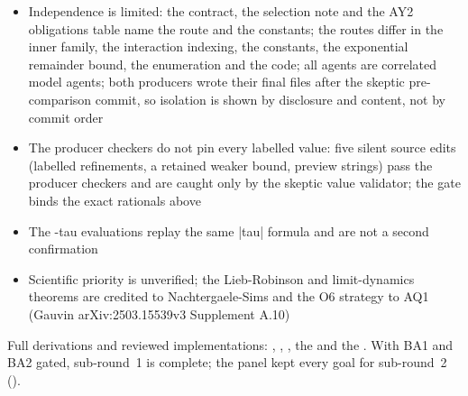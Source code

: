 \begin{gatequote}
\begin{itemize}
compactness and diagonal extraction via AY1; the I1 dictionary;
Stone\textquotesingle{}s theorem, Fourier inversion and the tensor-product
exponential of commuting self-adjoint operators on separate factors
\item Independence is limited: the contract, the selection note and the AY2
obligations table name the route and the constants; the routes differ in the
inner family, the interaction indexing, the constants, the exponential
remainder bound, the enumeration and the code; all agents are correlated model
agents; both producers wrote their final files after the skeptic
pre-comparison commit, so isolation is shown by disclosure and content, not by
commit order
\item The producer checkers do not pin every labelled value: five silent
source edits (labelled refinements, a retained weaker bound, preview strings)
pass the producer checkers and are caught only by the skeptic value validator;
the gate binds the exact rationals above
\item The -tau evaluations replay the same |tau| formula and are not a second
confirmation
\item Scientific priority is unverified; the Lieb-Robinson and limit-dynamics
theorems are credited to Nachtergaele-Sims and the O6 strategy to AQ1 (Gauvin
arXiv:2503.15539v3 Supplement A.10)
\end{itemize}
\end{gatequote}
Full derivations and reviewed implementations:
,
,
, the
 and the . With BA1 and BA2 gated, sub-round~1 is complete; the panel kept
every goal for sub-round~2
().
